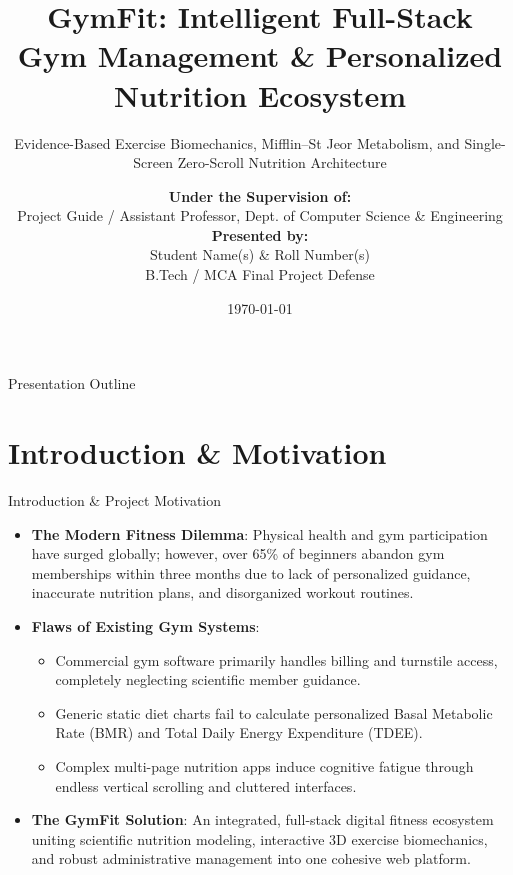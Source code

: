 \documentclass[aspectratio=169,10pt]{beamer}
\title[\textbf{GymFit} Ecosystem]{\textbf{GymFit: Intelligent Full-Stack Gym Management \& Personalized Nutrition Ecosystem}}
\subtitle{Evidence-Based Exercise Biomechanics, Mifflin--St Jeor Metabolism, and Single-Screen Zero-Scroll Nutrition Architecture}
\author[Project Presentation]{
  \textbf{Under the Supervision of:}\\
  Project Guide / Assistant Professor, Dept. of Computer Science \& Engineering\\[0.3cm]
  \textbf{Presented by:}\\
  Student Name(s) \& Roll Number(s)\\
  B.Tech / MCA Final Project Defense
}
\institute[CSE Dept.]{Department of Computer Science \& Engineering}
\date{\today}
\begin{document}
\begin{frame}
  \titlepage
\end{frame}

\begin{frame}{Presentation Outline}
  \tableofcontents
\end{frame}

\section{Introduction \& Motivation}

\begin{frame}{Introduction \& Project Motivation}
  \begin{itemize}
    \item \textbf{The Modern Fitness Dilemma}: Physical health and gym participation have surged globally; however, over 65\% of beginners abandon gym memberships within three months due to lack of personalized guidance, inaccurate nutrition plans, and disorganized workout routines.
    \item \textbf{Flaws of Existing Gym Systems}:
    \begin{itemize}
      \item Commercial gym software primarily handles billing and turnstile access, completely neglecting scientific member guidance.
      \item Generic static diet charts fail to calculate personalized Basal Metabolic Rate (BMR) and Total Daily Energy Expenditure (TDEE).
      \item Complex multi-page nutrition apps induce cognitive fatigue through endless vertical scrolling and cluttered interfaces.
    \end{itemize}
    \item \textbf{The GymFit Solution}: An integrated, full-stack digital fitness ecosystem uniting scientific nutrition modeling, interactive 3D exercise biomechanics, and robust administrative management into one cohesive web platform.
  \end{itemize}
\end{frame}
\end{document}
